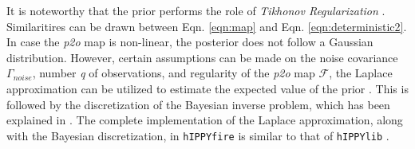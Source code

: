 It is noteworthy that the prior performs the role of \textit{Tikhonov Regularization} \cite{golub1999tikhonov}. Similaritires can be drawn between Eqn. \eqref{eqn:map} and Eqn. \eqref{eqn:deterministic2}. In case the \textit{p2o} map is non-linear, the posterior does not follow a Gaussian distribution. However, certain assumptions can be made on the noise covariance $\Gamma_{noise}$, number \textit{q} of observations, and regularity of the \textit{p2o} map $\mathcal{F}$, the Laplace approximation can be utilized to estimate the expected value of the prior \cite{tierney1986accurate, evans2000approximating}. This is followed by the discretization of the Bayesian inverse problem, which has been explained in \cite{thanh2013infinitebayesian, villa2018hippylib}. The complete implementation of the Laplace approximation, along with the Bayesian discretization, in \texttt{hIPPYfire} is similar to that of \texttt{hIPPYlib} \cite{villa2018hippylib}.